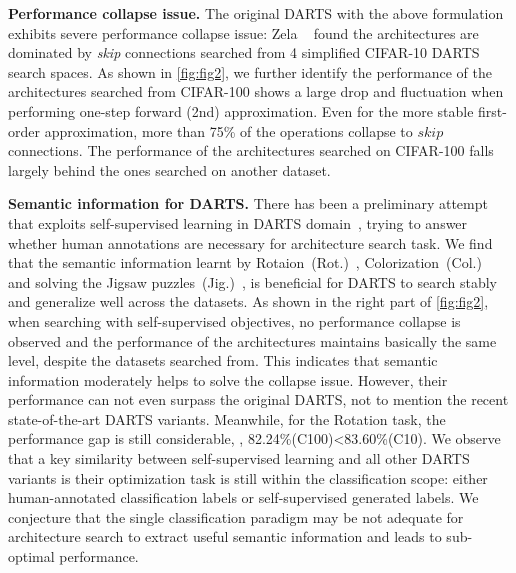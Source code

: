 \documentclass[10pt,twocolumn,letterpaper]{article}
\newcommand{\mypara}[1]{\vspace{1mm}\noindent\textbf{#1}}
\begin{document}
   \mypara{Performance collapse issue.}
The original DARTS with the above formulation exhibits severe performance collapse issue: 
Zela \etal~\cite{Zela2020Understanding} found the architectures are dominated by \textit{skip} connections searched from 4 simplified CIFAR-10 DARTS search spaces.
As shown in \cref{fig:fig2}, we further identify the performance of the architectures searched from CIFAR-100 shows a large drop and fluctuation when performing one-step forward (2nd) approximation. 
Even for the more stable first-order approximation, more than 75\% of the operations collapse to $skip$ connections. 
The performance of the architectures searched on CIFAR-100 falls largely behind the ones searched on another dataset.

\mypara{Semantic information for DARTS.}
There has been a preliminary attempt that exploits self-supervised learning in DARTS domain~\cite{liu_2020_unnas}, trying to answer whether human annotations are necessary for architecture search task.
We find that the semantic information 
learnt by Rotaion~(Rot.)~\cite{gidaris_2018_rotation}, Colorization~(Col.)~\cite{zhang_2016_col} and solving the Jigsaw puzzles~(Jig.)~\cite{noroozi_2016_jigsaw},
is beneficial for DARTS to search stably and generalize well across the datasets.
As shown in the right part of \cref{fig:fig2}, when searching with self-supervised objectives, no performance collapse is observed and the performance of the architectures maintains basically the same level, despite the datasets searched from. 
This indicates that semantic information moderately helps to solve the collapse issue.
However, their performance can not even surpass the original DARTS, not to mention the recent state-of-the-art DARTS variants.
Meanwhile, for the Rotation task, the performance gap is still considerable, \ie, 82.24\%(C100)\textless83.60\%(C10).
We observe that a key similarity between self-supervised learning and all other DARTS variants is their optimization task is still within the classification scope: either human-annotated classification labels or self-supervised generated labels.
We conjecture that the single classification paradigm may be not adequate for architecture search to extract useful semantic information and leads to sub-optimal performance.
\end{document}

